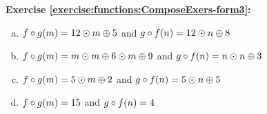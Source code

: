 \noindent\textbf{Exercise \ref{exercise:functions:ComposeExers-form3}:}\\
\begin{enumerate}[(a)]
\item 
$f\circ g(m) = 12 \odot m \oplus 5$ and $g \circ f(n) = 12\odot n \oplus 8$
\item 
$f\circ g(m) = m \odot m \oplus 6 \odot m \oplus 9$ and $g \circ f(n) = n\odot n \oplus 3$
\item 
$f\circ g(m) = 5 \odot m \oplus 2$ and $g \circ f(n) = 5\odot n \oplus 5$
\item 
$f\circ g(m) = 15$ and $g \circ f(n) = 4$
\end{enumerate}


